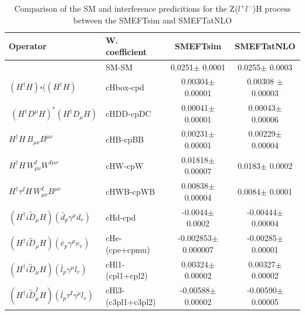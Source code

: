 \begin{center}
  \begin{table}[h]
    \begin{tabular}{|l|l|c|c|}
      \hline
      \textbf{Operator} &\textbf{W. coefficient} & \textbf{SMEFTsim} & \textbf{SMEFTatNLO} \\
      \hline
      &  SM-SM & 0.0251$\pm$ 0.0001& 0.0255$\pm$ 0.0003\\
      \hline
      $(H^{\dagger}H)\square((H^{\dagger}H)$ & cHbox-cpd & 0.00304$\pm$ 0.00001& 0.00308 $\pm$ 0.00003\\
      \hline
      $\ \left(H^\dag D^\mu H\right)^* \left(H^\dag D_\mu H\right)$ & cHDD-cpDC & 0.00041$\pm$ 0.00001& 0.00043$\pm$ 0.00006\\
      \hline
      $ H^\dag H\, B_{\mu\nu} B^{\mu\nu}$ & cHB-cpBB & 0.00231$\pm$ 0.00001& 0.00229$\pm$ 0.00004\\
      \hline
      $H^\dag H\, W^I_{\mu\nu} W^{I\mu\nu}$ & cHW-cpW & 0.01818$\pm$ 0.00007& 0.0183$\pm$ 0.0002\\
      \hline
      $ H^\dag \tau^I H\, W^I_{\mu\nu} B^{\mu\nu}$ &cHWB-cpWB & 0.00838$\pm$ 0.00004& 0.0084$\pm$ 0.0001\\
      \hline
      $(H^\dag i\overleftrightarrow{D}_\mu H)(\bar d_p \gamma^\mu d_r)$ & cHd-cpd &-0.0044$\pm$ 0.0002 & -0.00444$\pm$ 0.00004\\
      \hline
      $(H^\dag i\overleftrightarrow{D}_\mu H)(\bar e_p \gamma^\mu e_r)$ & cHe-(cpe+cpmu) &-0.002853$\pm$ 0.000007& -0.00285$\pm$ 0.00001\\
      \hline
      $(H^\dag i\overleftrightarrow{D}_\mu H)(\bar l_p \gamma^\mu l_r)$ & cHl1-(cpl1+cpl2) & 0.00324$\pm$ 0.00002 & 0.00327$\pm$ 0.00002\\
      \hline
      $(H^\dag i\overleftrightarrow{D}^I_\mu H)(\bar l_p \tau^I \gamma^\mu l_r)$ & cHl3-(c3pl1+c3pl2) & -0.00588$\pm$ 0.00002& -0.00590$\pm$ 0.00005\\
      
      \hline
    \end{tabular}
    \caption{ Comparison of the SM and interference predicitions for the Z($l^{+}l^{-}$)H process between the SMEFTsim and SMEFTatNLO}
    
  \end{table}
\end{center}





